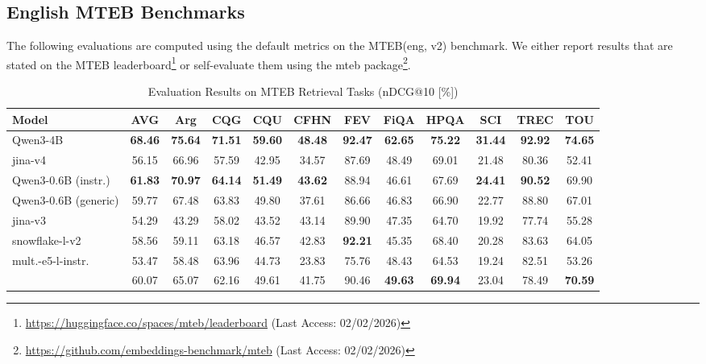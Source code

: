 \documentclass[11pt]{article}
\begin{document}
\subsection{English MTEB Benchmarks}
\label{app:en-mteb}

The following evaluations are computed using the default metrics on the MTEB(eng, v2) benchmark.
We either report results that are stated on the MTEB leaderboard\footnote{\url{https://huggingface.co/spaces/mteb/leaderboard} \tiny{(Last Access: 02/02/2026)}} or self-evaluate them using the mteb package\footnote{\url{https://github.com/embeddings-benchmark/mteb} \tiny{(Last Access: 02/02/2026)}}.

\begin{table}[H]
\centering
\caption{Evaluation Results on MTEB Retrieval Tasks (nDCG@10 [\%])}
\label{tab:mteb_retrieval}
\small{
\setlength{\tabcolsep}{4pt}
\begin{tabular}{lccccccccccc}
\toprule
\textbf{Model} & \textbf{AVG} & \textbf{Arg} & \textbf{CQG} & \textbf{CQU} & \textbf{CFHN} & \textbf{FEV} & \textbf{FiQA} & \textbf{HPQA} & \textbf{SCI} & \textbf{TREC} & \textbf{TOU} \\
\midrule
Qwen3-4B & \textbf{68.46} & \textbf{75.64} & \textbf{71.51} & \textbf{59.60} & \textbf{48.48} & \textbf{92.47} & \textbf{62.65} & \textbf{75.22} & \textbf{31.44} & \textbf{92.92} & \textbf{74.65} \\
jina-v4 & 56.15 & 66.96 & 57.59 & 42.95 & 34.57 & 87.69 & 48.49 & 69.01 & 21.48 & 80.36 & 52.41 \\
\midrule
Qwen3-0.6B (instr.) & \textbf{61.83} & \textbf{70.97} & \textbf{64.14} & \textbf{51.49} & \textbf{43.62} & 88.94 & 46.61 & 67.69 & \textbf{24.41} & \textbf{90.52} & 69.90 \\
Qwen3-0.6B (generic) & 59.77 & 67.48 & 63.83 & 49.80 & 37.61 & 86.66 & 46.83 & 66.90 & 22.77 & 88.80 & 67.01 \\
jina-v3 & 54.29 & 43.29 & 58.02 & 43.52 & 43.14 & 89.90 & 47.35 & 64.70 & 19.92 & 77.74 & 55.28 \\
snowflake-l-v2 & 58.56 & 59.11 & 63.18 & 46.57 & 42.83 & \textbf{92.21} & 45.35 & 68.40 & 20.28 & 83.63 & 64.05 \\
mult.-e5-l-instr. & 53.47 & 58.48 & 63.96 & 44.73 & 23.83 & 75.76 & 48.43 & 64.53 & 19.24 & 82.51 & 53.26 \\
\JEmbeddingVFiveTextSmallShort{} & 60.07 & 65.07 & 62.16 & 49.61 & 41.75 & 90.46 & \textbf{49.63} & \textbf{69.94} & 23.04 & 78.49 & \textbf{70.59} \\
\midrule

\end{tabular}}
\end{table}
\end{document}
